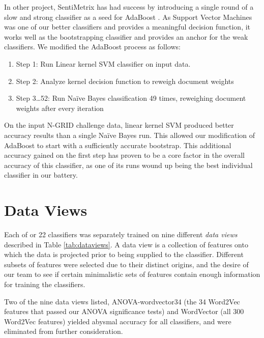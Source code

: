 In other project, SentiMetrix has had success by introducing a single round of a slow and strong classifier as a seed for AdaBoost \cite{darpa}. As Support Vector Machines was one of our better classifiers and provides a meaningful decision function, it works well as the bootstrapping classifier and provides an anchor for the weak classifiers. We modified the AdaBoost process as follows:

\begin{enumerate}
    \item \textsf{Step 1:} Run Linear kernel SVM classifier on input data. 
    \item \textsf{Step 2:} Analyze kernel decision function to reweigh document weights
    \item \textsf{Step 3\ldots52:} Run Na\"{i}ve Bayes classification 49 times, reweighing document weights after every iteration
\end{enumerate}

On the input N-GRID challenge data, linear kernel SVM produced better
accuracy results than a single Na\"{i}ve Bayes run. This allowed our 
modification of AdaBoost to start with a sufficiently accurate bootstrap.
This additional accuracy gained on the first step has proven to be 
a core factor in the overall accuracy of this classifier, as one
of its runs wound up being the best individual classifier in our
battery.


\section{Data Views}

Each of or 22 classifiers 
was separately trained on nine different \textit{data views} described
in Table \ref{tab:dataviews}.  A data view is a collection of features
onto which the data is projected prior to being supplied to the classifier.
Different subsets of features were selected due to their distinct origins,
and the desire of our team to see if certain minimalistic sets of
features contain enough information for training the classifiers.

Two of the nine data views listed, 
\textsf{ANOVA-wordvector34} (the 34 \textsf{Word2Vec} features that
passed our ANOVA significance tests) and \textsf{WordVector}
(all 300 \textsf{Word2Vec} features) yielded abysmal accuracy for
all classifiers, and were eliminated from further consideration.

